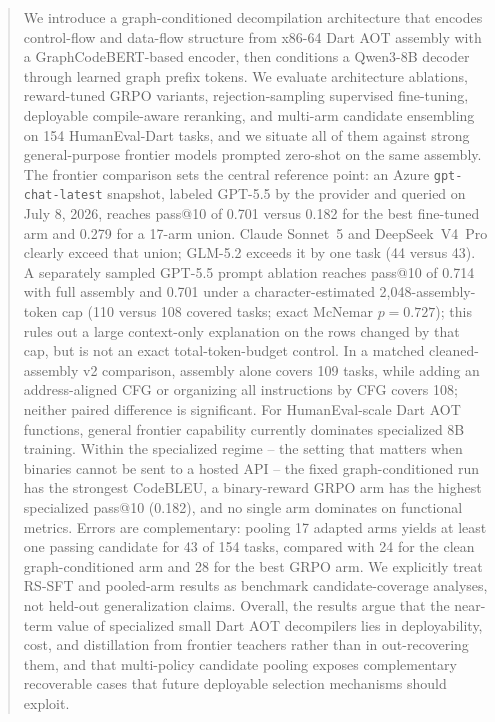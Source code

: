 \documentclass[11pt]{article}
\begin{document}
\begin{abstract}
We introduce a graph-conditioned decompilation architecture that encodes control-flow and data-flow structure from x86-64 Dart AOT assembly with a GraphCodeBERT-based encoder, then conditions a Qwen3-8B decoder through learned graph prefix tokens. We evaluate architecture ablations, reward-tuned GRPO variants, rejection-sampling supervised fine-tuning, deployable compile-aware reranking, and multi-arm candidate ensembling on 154 HumanEval-Dart tasks, and we situate all of them against strong general-purpose frontier models prompted zero-shot on the same assembly. The frontier comparison sets the central reference point: an Azure \texttt{gpt-chat-latest} snapshot, labeled GPT-5.5 by the provider and queried on July 8, 2026, reaches pass@10 of 0.701 versus 0.182 for the best fine-tuned arm and 0.279 for a 17-arm union. Claude Sonnet~5 and DeepSeek~V4~Pro clearly exceed that union; GLM-5.2 exceeds it by one task (44 versus 43). A separately sampled GPT-5.5 prompt ablation reaches pass@10 of 0.714 with full assembly and 0.701 under a character-estimated 2{,}048-assembly-token cap (110 versus 108 covered tasks; exact McNemar \(p=0.727\)); this rules out a large context-only explanation on the rows changed by that cap, but is not an exact total-token-budget control. In a matched cleaned-assembly v2 comparison, assembly alone covers 109 tasks, while adding an address-aligned CFG or organizing all instructions by CFG covers 108; neither paired difference is significant. For HumanEval-scale Dart AOT functions, general frontier capability currently dominates specialized 8B training. Within the specialized regime -- the setting that matters when binaries cannot be sent to a hosted API -- the fixed graph-conditioned run has the strongest CodeBLEU, a binary-reward GRPO arm has the highest specialized pass@10 (0.182), and no single arm dominates on functional metrics. Errors are complementary: pooling 17 adapted arms yields at least one passing candidate for 43 of 154 tasks, compared with 24 for the clean graph-conditioned arm and 28 for the best GRPO arm. We explicitly treat RS-SFT and pooled-arm results as benchmark candidate-coverage analyses, not held-out generalization claims. Overall, the results argue that the near-term value of specialized small Dart AOT decompilers lies in deployability, cost, and distillation from frontier teachers rather than in out-recovering them, and that multi-policy candidate pooling exposes complementary recoverable cases that future deployable selection mechanisms should exploit.
\end{abstract}
\end{document}
